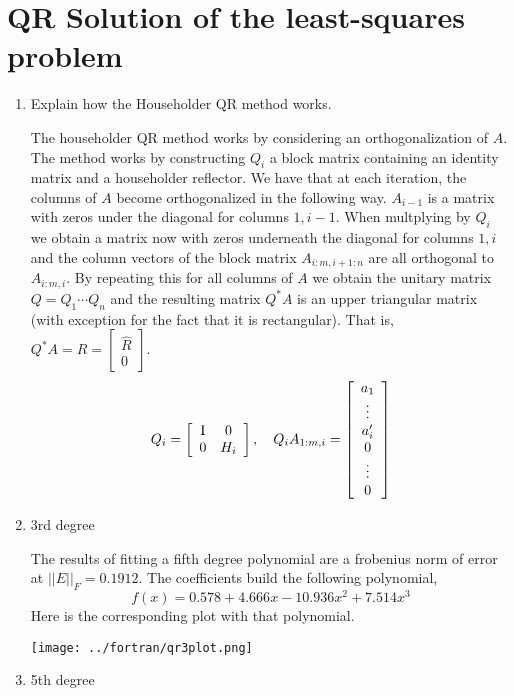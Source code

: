 \documentclass{article}
\begin{document}
\section{QR Solution of the least-squares problem}
\begin{enumerate}
\item  Explain how the Householder QR method works. 
    
    The householder QR method works by considering an orthogonalization of $A$. The method works by constructing $Q_i$ a block matrix containing an identity matrix and a householder reflector. We have that at each iteration, the columns of $A$ become orthogonalized in the following way.  $A_{i-1}$ is a matrix with zeros under the diagonal for columns $1, i-1$. When multplying by $Q_i$ we obtain a matrix now with zeros underneath the diagonal for columns $1, i$ and the column vectors of the block matrix $A_{i:m, i+1:n}$ are all orthogonal to $A_{i:m, i}$. By repeating this for all columns of $A$ we obtain the unitary matrix $Q = Q_1\cdots Q_n$ and the resulting matrix $Q^*A$ is an upper triangular matrix (with exception for the fact that it is rectangular). That is, $Q^*A = R = \left[\begin{array}{c} \hat{R} \\ 0\end{array}\right]$. 
    \[
        Q_i = \left[\begin{array}{c c} \mathrm{I} & 0 \\ 0 & H_i \end{array}\right], \quad 
        Q_iA_{1:m, i} = \left[\begin{array}{c}a_{1} \\ \vdots\\ a_{i}' \\ 0 \\ \vdots\\ 0 \end{array}\right]
    \]

\item 3rd degree

The results of fitting a fifth degree polynomial are a frobenius norm of error at $||E||_F = 0.1912$. The coefficients build the following polynomial, 
    \[
        f(x) = 0.578 + 4.666x - 10.936x^2 + 7.514x^3
    \]
    Here is the corresponding plot with that polynomial. 
    
        \centering
        \texttt{[image: ../fortran/qr3plot.png]}
    \emp

\item 5th degree


\end{enumerate}
\end{document}

